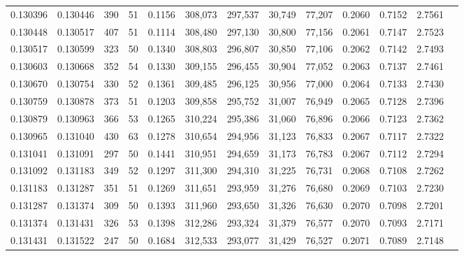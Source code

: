\begin{tabular}{rrrrrrrrrrrrr}
0.130396 & 0.130446 &   390 &  51 &                                     0.1156 & 308,073 & 297,537 &  30,749 &  77,207 & 0.2060 & 0.7152 & 2.7561 \\
0.130448 & 0.130517 &   407 &  51 &                                     0.1114 & 308,480 & 297,130 &  30,800 &  77,156 & 0.2061 & 0.7147 & 2.7523 \\
0.130517 & 0.130599 &   323 &  50 &                                     0.1340 & 308,803 & 296,807 &  30,850 &  77,106 & 0.2062 & 0.7142 & 2.7493 \\
0.130603 & 0.130668 &   352 &  54 &                                     0.1330 & 309,155 & 296,455 &  30,904 &  77,052 & 0.2063 & 0.7137 & 2.7461 \\
0.130670 & 0.130754 &   330 &  52 &                                     0.1361 & 309,485 & 296,125 &  30,956 &  77,000 & 0.2064 & 0.7133 & 2.7430 \\
0.130759 & 0.130878 &   373 &  51 &                                     0.1203 & 309,858 & 295,752 &  31,007 &  76,949 & 0.2065 & 0.7128 & 2.7396 \\
0.130879 & 0.130963 &   366 &  53 &                                     0.1265 & 310,224 & 295,386 &  31,060 &  76,896 & 0.2066 & 0.7123 & 2.7362 \\
0.130965 & 0.131040 &   430 &  63 &                                     0.1278 & 310,654 & 294,956 &  31,123 &  76,833 & 0.2067 & 0.7117 & 2.7322 \\
0.131041 & 0.131091 &   297 &  50 &                                     0.1441 & 310,951 & 294,659 &  31,173 &  76,783 & 0.2067 & 0.7112 & 2.7294 \\
0.131092 & 0.131183 &   349 &  52 &                                     0.1297 & 311,300 & 294,310 &  31,225 &  76,731 & 0.2068 & 0.7108 & 2.7262 \\
0.131183 & 0.131287 &   351 &  51 &                                     0.1269 & 311,651 & 293,959 &  31,276 &  76,680 & 0.2069 & 0.7103 & 2.7230 \\
0.131287 & 0.131374 &   309 &  50 &                                     0.1393 & 311,960 & 293,650 &  31,326 &  76,630 & 0.2070 & 0.7098 & 2.7201 \\
0.131374 & 0.131431 &   326 &  53 &                                     0.1398 & 312,286 & 293,324 &  31,379 &  76,577 & 0.2070 & 0.7093 & 2.7171 \\
0.131431 & 0.131522 &   247 &  50 &                                     0.1684 & 312,533 & 293,077 &  31,429 &  76,527 & 0.2071 & 0.7089 & 2.7148 \\

\end{tabular}

